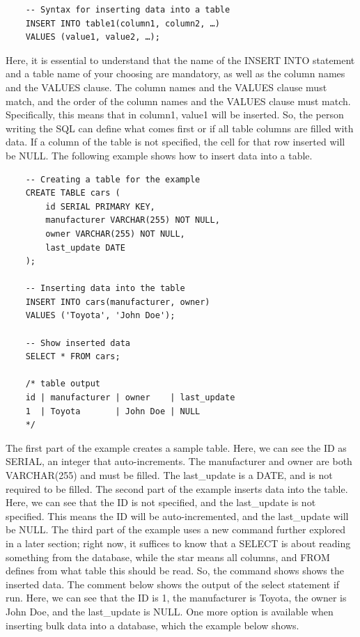 \begin{verbatim}
    -- Syntax for inserting data into a table
    INSERT INTO table1(column1, column2, …)
    VALUES (value1, value2, …);
\end{verbatim}

Here, it is essential to understand that the name of the INSERT INTO statement and a table name of your choosing are mandatory, as well as the column names and the VALUES clause. The column names and the VALUES clause must match, and the order of the column names and the VALUES clause must match. Specifically, this means that in column1, value1 will be inserted. So, the person writing the SQL can define what comes first or if all table columns are filled with data. If a column of the table is not specified, the cell for that row inserted will be NULL. The following example shows how to insert data into a table.

\begin{verbatim}
    -- Creating a table for the example
    CREATE TABLE cars (
        id SERIAL PRIMARY KEY,
        manufacturer VARCHAR(255) NOT NULL,
        owner VARCHAR(255) NOT NULL,
        last_update DATE
    );

    -- Inserting data into the table
    INSERT INTO cars(manufacturer, owner)
    VALUES ('Toyota', 'John Doe');

    -- Show inserted data
    SELECT * FROM cars;

    /* table output
    id | manufacturer | owner    | last_update
    1  | Toyota       | John Doe | NULL
    */
\end{verbatim}

The first part of the example creates a sample table. Here, we can see the ID as SERIAL, an integer that auto-increments. The manufacturer and owner are both VARCHAR(255) and must be filled. The last\_update is a DATE, and is not required to be filled. The second part of the example inserts data into the table. Here, we can see that the ID is not specified, and the last\_update is not specified. This means the ID will be auto-incremented, and the last\_update will be NULL. The third part of the example uses a new command further explored in a later section; right now, it suffices to know that a SELECT is about reading something from the database, while the star means all columns, and FROM defines from what table this should be read. So, the command shows shows the inserted data. The comment below shows the output of the select statement if run. Here, we can see that the ID is 1, the manufacturer is Toyota, the owner is John Doe, and the last\_update is NULL. One more option is available when inserting bulk data into a database, which the example below shows.

